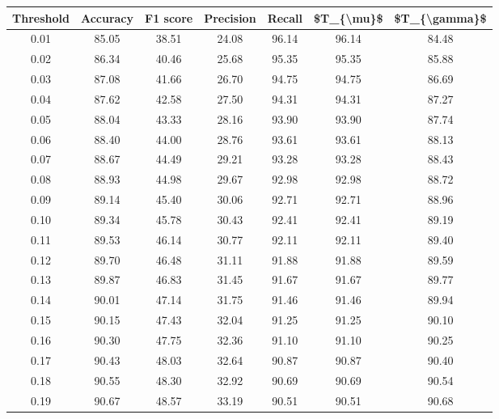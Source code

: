 \begin{tabular}{|c|c|c|c|c|c|c|}
\hline
 Threshold &  Accuracy &  F1 score &  Precision &  Recall &  \$T\_\{\textbackslash mu\}\$ &  \$T\_\{\textbackslash gamma\}\$ \\
\hline
      0.01 &     85.05 &     38.51 &      24.08 &   96.14 &      96.14 &         84.48 \\
      0.02 &     86.34 &     40.46 &      25.68 &   95.35 &      95.35 &         85.88 \\
      0.03 &     87.08 &     41.66 &      26.70 &   94.75 &      94.75 &         86.69 \\
      0.04 &     87.62 &     42.58 &      27.50 &   94.31 &      94.31 &         87.27 \\
      0.05 &     88.04 &     43.33 &      28.16 &   93.90 &      93.90 &         87.74 \\
      0.06 &     88.40 &     44.00 &      28.76 &   93.61 &      93.61 &         88.13 \\
      0.07 &     88.67 &     44.49 &      29.21 &   93.28 &      93.28 &         88.43 \\
      0.08 &     88.93 &     44.98 &      29.67 &   92.98 &      92.98 &         88.72 \\
      0.09 &     89.14 &     45.40 &      30.06 &   92.71 &      92.71 &         88.96 \\
      0.10 &     89.34 &     45.78 &      30.43 &   92.41 &      92.41 &         89.19 \\
      0.11 &     89.53 &     46.14 &      30.77 &   92.11 &      92.11 &         89.40 \\
      0.12 &     89.70 &     46.48 &      31.11 &   91.88 &      91.88 &         89.59 \\
      0.13 &     89.87 &     46.83 &      31.45 &   91.67 &      91.67 &         89.77 \\
      0.14 &     90.01 &     47.14 &      31.75 &   91.46 &      91.46 &         89.94 \\
      0.15 &     90.15 &     47.43 &      32.04 &   91.25 &      91.25 &         90.10 \\
      0.16 &     90.30 &     47.75 &      32.36 &   91.10 &      91.10 &         90.25 \\
      0.17 &     90.43 &     48.03 &      32.64 &   90.87 &      90.87 &         90.40 \\
      0.18 &     90.55 &     48.30 &      32.92 &   90.69 &      90.69 &         90.54 \\
      0.19 &     90.67 &     48.57 &      33.19 &   90.51 &      90.51 &         90.68 \\

\end{tabular}
